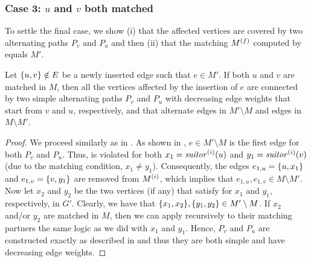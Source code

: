\subsubsection{Case 3: $u$ and $v$ both matched}
%
To settle the final case, we show (i) that the affected vertices are
covered by two alternating paths $P_v$ and $P_u$ and then (ii)
that the matching $M^{(f)}$ computed by  equals $M'$.

\begin{lemma}
\label{lemma:dyn-mwm:alternating-paths}
Let $\set{u, v}\notin E$ be a newly inserted edge such that $e \in M'$. If both $u$ and $v$
are matched in $M$, then all the vertices affected by the insertion of $e$ are connected
by two simple alternating paths $P_v$ and $P_u$ with decreasing edge weights
that start from $v$ and $u$, respectively, and that alternate edges in $M'
\setminus M$ and edges in $M\setminus M'$.
\end{lemma}

\begin{proof}
We proceed similarly as in . As shown in
, $e\in M'\setminus M$ is the first edge for
both $P_v$ and $P_u$. Thus,  is violated for both
$x_1  = \mathit{suitor}^{(i)}(u)$ and $y_1 = \mathit{suitor}^{(i)}(v)$ (due to the
matching condition, $x_1 \neq y_1$). Consequently, the edges
$e_{1, u} = \set{u, x_1}$ and $e_{1, v} = \set{v, y_1}$ are removed from
$M^{(i)}$, which implies that $e_{1,u}, e_{1, v} \in M
\setminus M'$. Now let $x_2$ and $y_2$ be the two
vertices (if any) that satisfy  for $x_1$ and $y_1$,
respectively, in $G'$.
Clearly, we have that $\set{x_1, x_2}, \set{y_1, y_2} \in M' \setminus M$. If
$x_2$ and/or $y_2$ are matched in $M$, then we can apply recursively to
their matching partners the same logic as we did with $x_1$ and $y_1$.
Hence, $P_v$ and $P_u$ are constructed exactly as described in
 and thus they are both simple and have
decreasing edge weights.
\end{proof}

